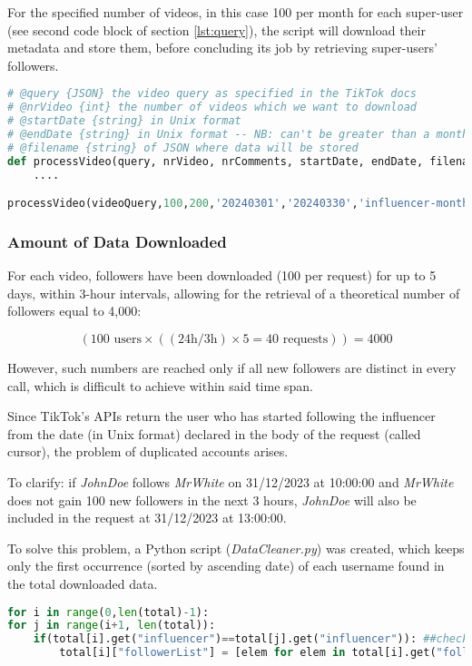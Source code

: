 For the specified number of videos, in this case 100 per month for each super-user (see second code block of section \ref{lst:query}), the script will download their metadata and store them, before concluding its job by retrieving super-users' followers.

\begin{lstlisting}[language=Python]
# @query {JSON} the video query as specified in the TikTok docs
# @nrVideo {int} the number of videos which we want to download
# @startDate {string} in Unix format
# @endDate {string} in Unix format -- NB: can't be greater than a month
# @filename {string} of JSON where data will be stored
def processVideo(query, nrVideo, nrComments, startDate, endDate, filename):
    ....

processVideo(videoQuery,100,200,'20240301','20240330','influencer-month')
\end{lstlisting}

\subsubsection*{Amount of Data Downloaded}

For each video, followers have been downloaded (100 per request) for up to 5 days, within 3-hour intervals, allowing for the retrieval of a theoretical number of followers equal to 4,000:

\[ (100 \text{ users} \times ((24 \text{h}/3 \text{h}) \times 5 = 40 \text{ requests})) = 4000 \]

However, such numbers are reached only if all new followers are distinct in every call, which is difficult to achieve within said time span.

Since TikTok's APIs return the user who has started following the influencer from the date (in Unix format) declared in the body of the request (called cursor), the problem of duplicated accounts arises.

To clarify: if \textit{JohnDoe} follows \textit{MrWhite} on 31/12/2023 at 10:00:00 and \textit{MrWhite} does not gain 100 new followers in the next 3 hours, \textit{JohnDoe} will also be included in the request at 31/12/2023 at 13:00:00.

To solve this problem, a Python script (\textit{DataCleaner.py}) was created, which keeps only the first occurrence (sorted by ascending date) of each username found in the total downloaded data.

\begin{lstlisting}[language=Python]
for i in range(0,len(total)-1):
for j in range(i+1, len(total)):
    if(total[i].get("influencer")==total[j].get("influencer")): ##check if the same influencer (we don't want to remove common followers)
        total[i]["followerList"] = [elem for elem in total[i].get("followerList") if elem not in total[j].get("followerList")]
\end{lstlisting}

